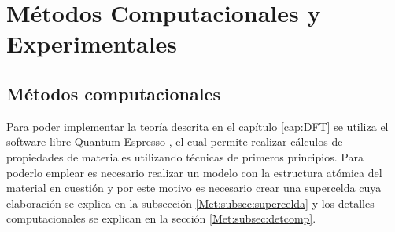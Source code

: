 \chapter{M\'etodos Computacionales y Experimentales} \label{cap:Metodos}
\section{M\'etodos computacionales} \label{Met:sec:mcomp}
Para poder implementar la teor\'ia descrita en el cap\'itulo \ref{cap:DFT} se utiliza el software libre Quantum-Espresso \cite{Giannozzi_2009,Giannozzi_2017}, el cual permite realizar c\'alculos de propiedades de materiales utilizando t\'ecnicas de primeros principios. Para poderlo emplear  es necesario realizar un modelo con la estructura at\'omica del material en cuesti\'on y  por este motivo es necesario crear una supercelda cuya elaboraci\'on se explica en la subsecci\'on \ref{Met:subsec:supercelda} y los detalles computacionales se explican en la secci\'on \ref{Met:subsec:detcomp}.
